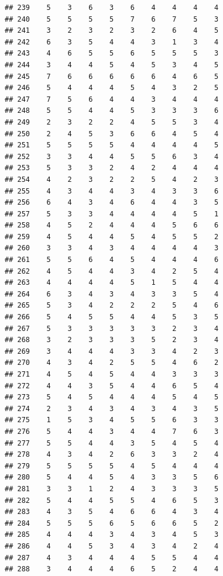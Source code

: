 \documentclass[
]{article}
\begin{document}
\begin{verbatim}
## 239    5    3    6    3    6    4    4    4    4
## 240    5    5    5    5    7    6    7    5    3
## 241    3    2    3    2    3    2    6    4    5
## 242    6    3    5    4    4    3    1    3    4
## 243    4    6    5    5    6    5    5    5    3
## 244    3    4    4    5    4    5    3    4    5
## 245    7    6    6    6    6    6    4    6    5
## 246    5    4    4    4    5    4    3    2    5
## 247    7    5    6    4    4    3    4    4    4
## 248    5    5    4    4    5    3    3    3    6
## 249    2    3    2    2    4    5    5    3    4
## 250    2    4    5    3    6    6    4    5    4
## 251    5    5    5    5    4    4    4    4    5
## 252    3    3    4    4    5    5    6    3    4
## 253    5    3    3    2    4    2    4    4    4
## 254    4    2    3    2    2    5    4    2    3
## 255    4    3    4    4    3    4    3    3    6
## 256    6    4    3    4    6    4    4    3    5
## 257    5    3    3    4    4    4    4    5    1
## 258    4    5    2    4    4    4    5    6    6
## 259    4    5    4    4    5    4    5    5    2
## 260    3    3    4    3    4    4    4    4    3
## 261    5    5    6    4    5    4    4    4    6
## 262    4    5    4    4    3    4    2    5    4
## 263    4    4    4    4    5    1    5    4    4
## 264    6    3    4    3    4    3    3    5    4
## 265    5    3    4    2    2    2    5    4    6
## 266    5    4    5    5    4    4    5    3    5
## 267    5    3    3    3    3    3    2    3    4
## 268    3    2    3    3    3    5    2    3    4
## 269    3    4    4    4    3    3    4    2    3
## 270    4    3    4    2    5    5    4    6    2
## 271    4    5    4    5    4    4    3    3    3
## 272    4    4    3    5    4    4    6    5    4
## 273    5    4    5    4    4    4    5    4    5
## 274    2    3    4    3    4    3    4    3    5
## 275    1    5    3    4    5    5    6    3    3
## 276    5    4    4    3    4    4    7    6    3
## 277    5    5    4    4    3    5    4    5    4
## 278    4    3    4    2    6    3    3    2    4
## 279    5    5    5    5    4    5    4    4    4
## 280    5    4    4    5    4    3    3    5    6
## 281    3    3    1    2    4    3    3    3    5
## 282    5    4    4    5    5    4    6    5    3
## 283    4    3    5    4    6    6    4    3    4
## 284    5    5    5    6    5    6    6    5    2
## 285    4    4    4    3    4    3    4    5    3
## 286    4    4    5    3    4    3    4    2    4
## 287    4    3    4    4    4    5    5    4    4
## 288    3    4    4    4    6    5    2    4    4

\end{verbatim}
\end{document}
